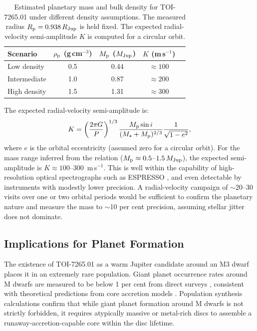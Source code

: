 \documentclass[fleqn,usenatbib]{mnras}
\newcommand{\Mjup}{M_{\rm Jup}}
\newcommand{\Rjup}{R_{\rm Jup}}
\begin{document}
\begin{table}
  \caption{Estimated planetary mass and bulk density for TOI-7265.01 under different density assumptions. The measured radius $R_{\rm p} = 0.938\,\Rjup$ is held fixed. The expected radial-velocity semi-amplitude $K$ is computed for a circular orbit.}
  \label{tab:massdens}
  \begin{tabular}{lcccc}
    \toprule
    Scenario & $\rho_{\rm p}$ (g\,cm$^{-3}$) & $M_{\rm p}$ ($\Mjup$) & $K$ (m\,s$^{-1}$) \\
    \midrule
    Low density & 0.5 & 0.44 & $\approx 100$ \\
    Intermediate & 1.0 & 0.87 & $\approx 200$ \\
    High density & 1.5 & 1.31 & $\approx 300$ \\
    \bottomrule
  \end{tabular}
\end{table}

The expected radial-velocity semi-amplitude is:
\begin{equation}
  \label{eq:rv}
  K = \left(\frac{2\pi G}{P}\right)^{1/3} \frac{M_{\rm p} \sin i}{(M_{\star} + M_{\rm p})^{2/3}} \frac{1}{\sqrt{1-e^2}},
\end{equation}
where $e$ is the orbital eccentricity (assumed zero for a circular orbit). For the mass range inferred from the \citet{chenkipping2017} relation ($M_{\rm p} \approx 0.5$--$1.5\,\Mjup$), the expected semi-amplitude is $K \approx 100$--$300$~m\,s$^{-1}$. This is well within the capability of high-resolution optical spectrographs such as ESPRESSO \citep[typical radial-velocity precision $\sim$1~m\,s$^{-1}$;][]{mayor1995}, and even detectable by instruments with modestly lower precision. A radial-velocity campaign of $\sim$20--30 visits over one or two orbital periods would be sufficient to confirm the planetary nature and measure the mass to $\sim$10 per cent precision, assuming stellar jitter does not dominate.

\subsection{Implications for Planet Formation}
\label{sec:formation}

The existence of TOI-7265.01 as a warm Jupiter candidate around an M3 dwarf places it in an extremely rare population. Giant planet occurrence rates around M dwarfs are measured to be below 1 per cent from direct surveys \citep{endl2006, johnson2010}, consistent with theoretical predictions from core accretion models \citep{mordasini2009}. Population synthesis calculations \citep{burn2021, schlecker2022} confirm that while giant planet formation around M dwarfs is not strictly forbidden, it requires atypically massive or metal-rich discs to assemble a runaway-accretion-capable core within the disc lifetime.
\end{document}
